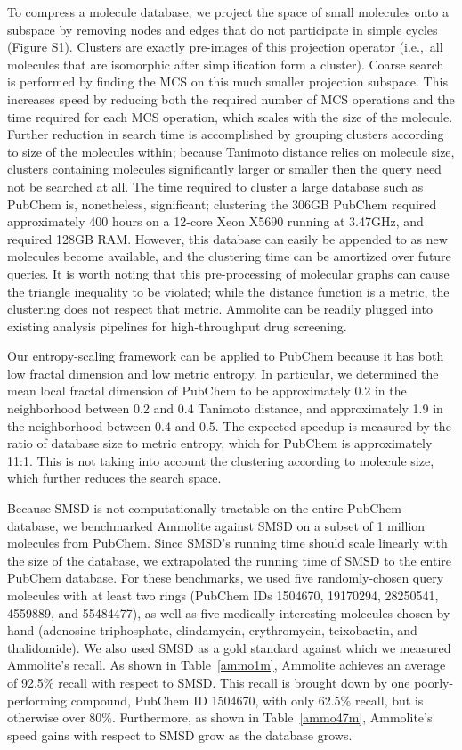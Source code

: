 \documentclass[review,preprint,12pt]{elsarticle}
\theoremstyle{definition}
\theoremstyle{remark}
\numberwithin{equation}{section}
\begin{document}
To compress a molecule database, we project the space of small molecules onto a subspace by removing nodes and edges that do not participate in simple cycles
(Figure S1).
Clusters are exactly pre-images of this projection operator (i.e.,~all molecules that are isomorphic after simplification form a cluster).
Coarse search is performed by finding the MCS on this much smaller projection subspace. This increases speed by reducing both the required number of MCS operations 
and the time required for each MCS operation, which scales with the size of the molecule.
Further reduction in search time is accomplished by grouping clusters according
to size of the molecules within; because Tanimoto distance relies on molecule
size, clusters containing molecules significantly larger or smaller then the
query need not be searched at all.
The time required to cluster a large database such as PubChem is, nonetheless, significant; clustering the 306GB PubChem required approximately 400 hours on a
12-core Xeon X5690 running at 3.47GHz, and required 128GB RAM.
However, this database can easily be appended to as new molecules become available, and the clustering time can be amortized over future queries.
It is worth noting that this pre-processing of molecular graphs can cause the 
triangle inequality to be violated; while the distance function is a metric, the
clustering does not respect that metric.
Ammolite can be readily plugged into existing analysis pipelines for 
high-throughput drug screening.

Our entropy-scaling framework can be applied to PubChem because it has both low fractal
dimension and low metric entropy.
In particular, we determined the mean local fractal dimension of PubChem to be 
approximately 0.2 in the neighborhood between 0.2 and 0.4 Tanimoto distance,
and approximately 1.9 in the neighborhood between 0.4 and 0.5.
The expected speedup is measured by the ratio of database size to metric entropy, which for PubChem is approximately 11:1.
This is not taking into account the clustering according to molecule size, which
further reduces the search space.

Because SMSD is not computationally tractable on the entire PubChem database,
we benchmarked Ammolite against SMSD on a subset of 1 million molecules from PubChem.
Since SMSD's running time should scale linearly with the size of the database, we extrapolated the
running time of SMSD to the entire PubChem database.
For these benchmarks, we used five randomly-chosen query molecules with at least two rings (PubChem IDs 1504670, 19170294, 28250541, 4559889, and 55484477), as well as five medically-interesting molecules chosen by hand (adenosine triphosphate, clindamycin, erythromycin, teixobactin, and thalidomide).
We also used SMSD as a gold standard against which we measured Ammolite's recall.
As shown in Table~\ref{ammo1m}, Ammolite achieves an average of 92.5\% recall with respect to SMSD. This recall is brought down by one poorly-performing compound, PubChem ID 1504670, with only 62.5\% recall, but is otherwise over 80\%.
Furthermore, as shown in Table~\ref{ammo47m}, Ammolite's speed gains with respect to SMSD grow as the database grows.
\end{document}
